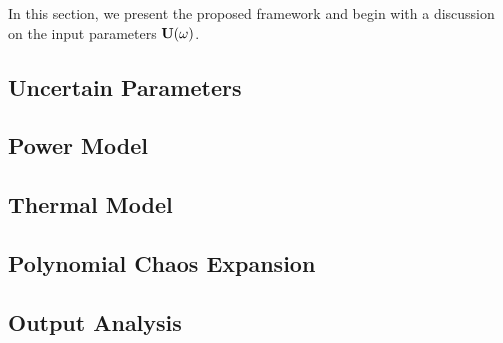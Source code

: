 In this section, we present the proposed framework and begin with a discussion on the input parameters $\mathbf{U}(\omega)$.

\subsection{Uncertain Parameters} 


\subsection{Power Model} 


\subsection{Thermal Model} 


\subsection{Polynomial Chaos Expansion} 


\subsection{Output Analysis}

